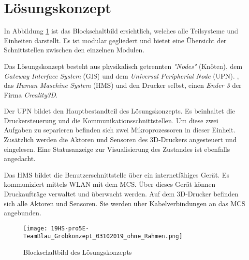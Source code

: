 \clearpage
\section{Lösungskonzept}\label{sec:Loesungskonzept}
In Abbildung \ref{img:Grobkonzept} ist das Blockschaltbild ersichtlich, welches alle Teilsysteme und Einheiten darstellt. Es ist modular gegliedert und bietet eine Übersicht der Schnittstellen zwischen den einzelnen Modulen. 

Das Lösungskonzept besteht aus physikalisch getrennten \textit{"Nodes"} (Knöten), dem \textit{Gateway Interface System} (GIS) und dem \textit{Universal Peripherial Node} (UPN). , das \textit{Human Maschine System} (HMS) und den Drucker selbst, einen \textit{Ender 3} der Firma \textit{Creality3D}. 

Der UPN bildet den Hauptbestandteil des Lösungskonzepts. Es beinhaltet die Druckersteuerung und die Kommunikationsschnittstellen. Um diese zwei Aufgaben zu separieren befinden sich zwei Mikroprozessoren in dieser Einheit. Zusätzlich werden die Aktoren und Sensoren des 3D-Druckers  angesteuert und eingelesen. Eine Statusanzeige zur Visualisierung des Zustandes ist ebenfalls angedacht.

Das HMS bildet die Benutzerschnittstelle über ein internetfähiges Gerät. Es kommuniziert mittels WLAN mit dem MCS. Über dieses Gerät können Druckaufträge verwaltet und überwacht werden. Auf dem 3D-Drucker befinden sich alle Aktoren und Sensoren. Sie werden über Kabelverbindungen an das MCS angebunden.



\begin{figure}
	\centering
	\texttt{[image: 19HS-pro5E-TeamBlau\_Grobkonzept\_03102019\_ohne\_Rahmen.png]}
	\caption{Blockschaltbild des Lösungskonzepts}
	\label{img:Grobkonzept}
\end{figure} 








